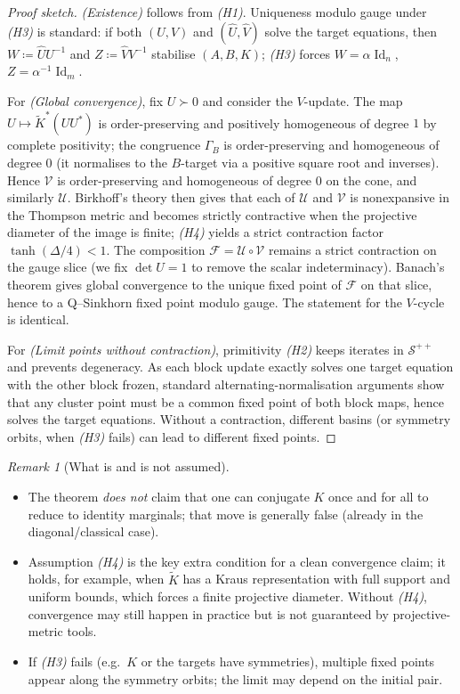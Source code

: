 \documentclass[10pt]{article}
\newcommand{\Ss}{\mathcal{S}}
\newcommand{\Id}{\operatorname{Id}}
\newcommand{\eqdef}{\coloneqq}
\newcommand{\Ko}{\widetilde{K}}
\theoremstyle{plain}
\theoremstyle{definition}
\theoremstyle{remark}
\newtheorem{rem}{Remark}
\begin{document}
\begin{proof}[Proof sketch]
\emph{(Existence)} follows from \emph{(H1)}. Uniqueness modulo gauge under \emph{(H3)} is standard: if both $(U,V)$ and $(\widehat U,\widehat V)$ solve the target equations, then $W\eqdef \widehat U U^{-1}$ and $Z\eqdef \widehat V V^{-1}$ stabilise $(A,B,K)$; \emph{(H3)} forces $W=\alpha\Id_n$, $Z=\alpha^{-1}\Id_m$.

For \emph{(Global convergence)}, fix $U\succ0$ and consider the $V$-update. The map
$U\mapsto \Ko^\ast(UU^\ast)$ is order-preserving and positively homogeneous of degree $1$ by complete positivity; the congruence $\Gamma_B$ is order-preserving and homogeneous of degree $0$ (it normalises to the $B$-target via a positive square root and inverses). Hence $\mathcal{V}$ is order-preserving and homogeneous of degree $0$ on the cone, and similarly $\mathcal{U}$. Birkhoff’s theory then gives that each of $\mathcal{U}$ and $\mathcal{V}$ is nonexpansive in the Thompson metric and becomes strictly contractive when the projective diameter of the image is finite; \emph{(H4)} yields a strict contraction factor $\tanh(\Delta/4)<1$.  
The composition $\mathcal{F}=\mathcal{U}\circ\mathcal{V}$ remains a strict contraction on the gauge slice (we fix $\det U=1$ to remove the scalar indeterminacy). Banach’s theorem gives global convergence to the unique fixed point of $\mathcal{F}$ on that slice, hence to a Q--Sinkhorn fixed point modulo gauge. The statement for the $V$-cycle is identical.

For \emph{(Limit points without contraction)}, primitivity \emph{(H2)} keeps iterates in $\Ss^{++}$ and prevents degeneracy. As each block update exactly solves one target equation with the other block frozen, standard alternating-normalisation arguments show that any cluster point must be a common fixed point of both block maps, hence solves the target equations. Without a contraction, different basins (or symmetry orbits, when \emph{(H3)} fails) can lead to different fixed points.
\end{proof}

\begin{rem}[What is and is not assumed]
\begin{itemize}
\item The theorem \emph{does not} claim that one can conjugate $K$ once and for all to reduce to identity marginals; that move is generally false (already in the diagonal/classical case).
\item Assumption \emph{(H4)} is the key extra condition for a clean convergence claim; it holds, for example, when $\Ko$ has a Kraus representation with full support and uniform bounds, which forces a finite projective diameter. Without \emph{(H4)}, convergence may still happen in practice but is not guaranteed by projective-metric tools.
\item If \emph{(H3)} fails (e.g.\ $K$ or the targets have symmetries), multiple fixed points appear along the symmetry orbits; the limit may depend on the initial pair.
\end{itemize}
\end{rem}
\end{document}
